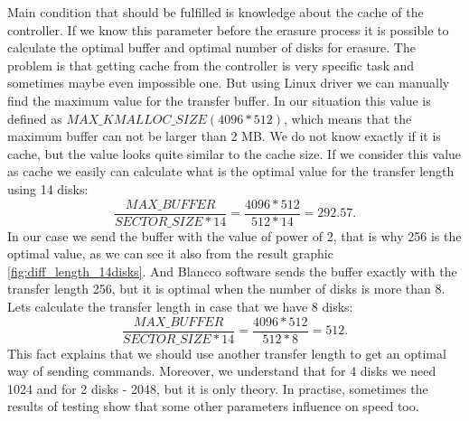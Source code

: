 Main condition that should be fulfilled is knowledge about the cache of the controller. If we know this parameter before the erasure process it is possible to calculate the optimal buffer and optimal number of disks for erasure. The problem is that getting cache from the controller is very specific task and sometimes maybe even impossible one. But using Linux driver we can manually find the maximum value for the transfer buffer. In our situation this value is defined as $MAX\_KMALLOC\_SIZE (4096*512)$, which means that the maximum buffer can not be larger than 2 MB. We do not know exactly if it is cache, but the value looks quite similar to the cache size. If we consider this value as cache we easily can calculate what is the optimal value for the transfer length using 14 disks:
\begin{equation}
	\frac{MAX\_BUFFER}{SECTOR\_SIZE*14} = \frac{4096*512}{512*14} = 292.57.
\end{equation}
In our case we send the buffer with the value of power of 2, that is why 256 is the optimal value, as we can see it also from the result graphic \ref{fig:diff_length_14disks}. And Blancco software sends the buffer exactly with the transfer length 256, but it is optimal when the number of disks is more than 8. Lets calculate the transfer length in case that we have 8 disks:
\begin{equation}
	\frac{MAX\_BUFFER}{SECTOR\_SIZE*14} = \frac{4096*512}{512*8} = 512.
\end{equation}
This fact explains that we should use another transfer length to get an optimal way of sending commands. Moreover, we understand that for 4 disks we need 1024 and for 2 disks - 2048, but it is only theory. In practise, sometimes the results of testing show that some other parameters influence on speed too.





